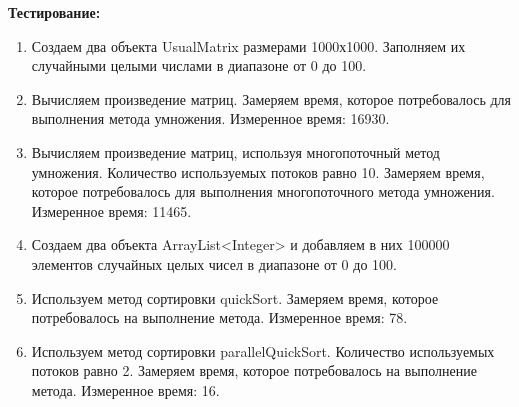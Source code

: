 \documentclass{article}
\begin{document}
	
	\textbf{Тестирование:}
	\begin{enumerate}
		\item Создаем два объекта UsualMatrix размерами 1000х1000. 
		Заполняем их случайными целыми числами в диапазоне от 
		0 до 100.
		\item Вычисляем произведение матриц. Замеряем время, которое 
		потребовалось для выполнения метода умножения. 
		Измеренное время: 16930.
		\item Вычисляем произведение матриц, используя 
		многопоточный метод умножения. Количество 
		используемых потоков равно 10. Замеряем время, которое 
		потребовалось для выполнения многопоточного метода 
		умножения. Измеренное время: 11465.
		\item Создаем два объекта ArrayList<Integer> и добавляем в них 
		100000 элементов случайных целых чисел в диапазоне от 0 
		до 100.
		\item Используем метод сортировки quickSort. Замеряем время, 
		которое потребовалось на выполнение метода. Измеренное 
		время: 78.
		\item Используем метод сортировки parallelQuickSort. 
		Количество используемых потоков равно 2. Замеряем 
		время, которое потребовалось на выполнение метода. 
		Измеренное время: 16.
	\end{enumerate}
\end{document}
